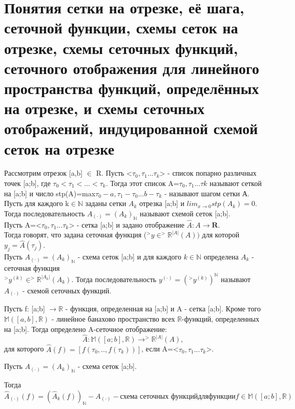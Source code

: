 \documentclass[__main__.tex]{subfiles}
\begin{document}
\section{Понятия сетки на отрезке, её шага, сеточной функции, схемы сеток на отрезке, схемы сеточных функций, сеточного отображения для линейного пространства функций, определённых на отрезке, и схемы сеточных отображений, индуцированной схемой сеток на отрезке}


Рассмотрим отрезок [a,b] $\in$ R. Пусть <$\tau_{0},\tau_{1}...\tau_{k}$> - список попарно различных точек [a;b], где $\tau_{0}<\tau_{1}<...<\tau_{k}$. Тогда этот список A=$\tau_{0},\tau_{1}...\tau{k}$ называют $\textbf{сеткой}$ на [a;b] и число stp(A)=max{$\tau_{0}-a,\tau_{1}-\tau_{0}...b-\tau_{k}$} - называют $\textbf{шагом}$ сетки А.
\\
Пусть для каждого k$\in \mathbb{N}$ заданы сетки $A_{k}$ отрезка [a;b] и $lim_{x \to 0}stp(A_{k})=0$. \\ Тогда последовательность $A_{(\cdot)}=(A_{k})_{\mathbb{N}}$ называют $\textbf{схемой сеток}$ [a;b].
\\
Пусть A=<$\tau_{0},\tau_{1}...\tau_{k}$> - сетка [a;b] и задано отображение $\hat{A}: A\to\textbf{R}$. \\ Тогда говорят, что задана $\textbf{сеточная функция}$  ($^>y \in ^> \mathbb{R}^{|A|}(A))$  для которой $y_{j}=\hat{A}(\tau_{j})$.
\\
Пусть $A_{(\cdot)}=(A_{k})_{\mathbb{N}}$ - схема сеток [a;b] и для каждого $k \in \mathbb{N}$ определена $A_{k}$ - сеточная функция \\ $^>y^{(k)} \in ^>\mathbb{R}^{|A_{k}|}(A_{k})$.  Тогда последовательность $y^{(\cdot)}=(^>y^{(k)})^{\mathbb{N}}$ называют $A_{(\cdot)}$ - $\textbf{схемой сеточных функций}$.

Пусть f: [a;b] $\to \mathbb{R}$ - функция, определенная на [a;b] и A - сетка [a;b]. Кроме того $\mathbb{M}([a,b],\mathbb{R})$ - линейное банахово пространство  всех $\mathbb{R}$-функций, определенных на [a;b]. Тогда определено A-$\textbf{сеточное отображение}:$ $$\hat{A}:\mathbb{M}([a;b],\mathbb{R})\to^>\mathbb{R}^{|A|}(A),$$ 
для которого $\hat{A}(f)=[f(\tau_{0},..,f(\tau_{k}))]$, если A=<$\tau_{0},\tau_{1}...\tau_{k}$>. 

Пусть $ A_{(\cdot)}=(A_{k})_{\mathbb{N}}$ - схема сеток [a;b].

Тогда  $$\hat{A}_{(\cdot)}(f)=(\hat{A}_{k}(f))_{\mathbb{N}} - A_{(\cdot)} - \textbf{схема сеточных функций}  для функции f \in \mathbb{M}([a;b],\mathbb{R})$$
\end{document}
